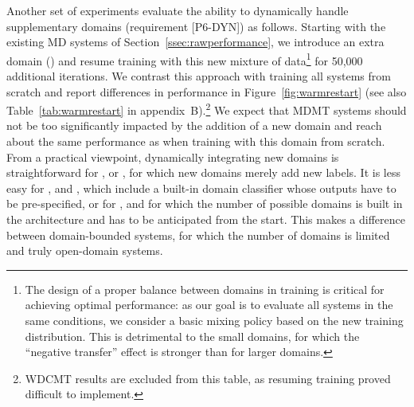 Another set of experiments evaluate the ability to dynamically handle supplementary domains (requirement [P6-DYN]) as follows. Starting with the existing MD systems of Section~\ref{ssec:rawperformance}, we introduce an extra domain () and resume training with this new mixture of data\footnote{The design of a proper balance between domains in training is critical for achieving optimal performance: as our goal is to evaluate all systems in the same conditions, we consider a basic mixing policy based on the new training distribution. This is detrimental to the small domains, for which the ``negative transfer'' effect is stronger than for larger domains.} for 50,000 additional iterations. We contrast this approach with training all systems from scratch and report differences in performance in Figure~\ref{fig:warmrestart} (see also Table~\ref{tab:warmrestart} in appendix~B).\footnote{WDCMT results are excluded from this table, as resuming training proved difficult to implement.}
We expect that MDMT systems should not be too significantly impacted by the addition of a new domain and reach about the same performance as when training with this domain from scratch. From a practical viewpoint, dynamically integrating new domains is straightforward for ,  or , for which new domains merely add new labels. It is less easy for ,  and , which include a built-in domain classifier whose outputs have to be pre-specified, or for ,  and  for which the number of possible domains is built in the architecture and has to be anticipated from the start. This makes a difference between domain-bounded systems, for which the number of domains is limited and truly open-domain systems.

\begin{figure*}[h!]
    \begin{center}
        
    \end{center}
    \caption[Ability to handle a new domain]{Ability to handle a new domain. .}
    \label{fig:warmrestart}
\end{figure*}


